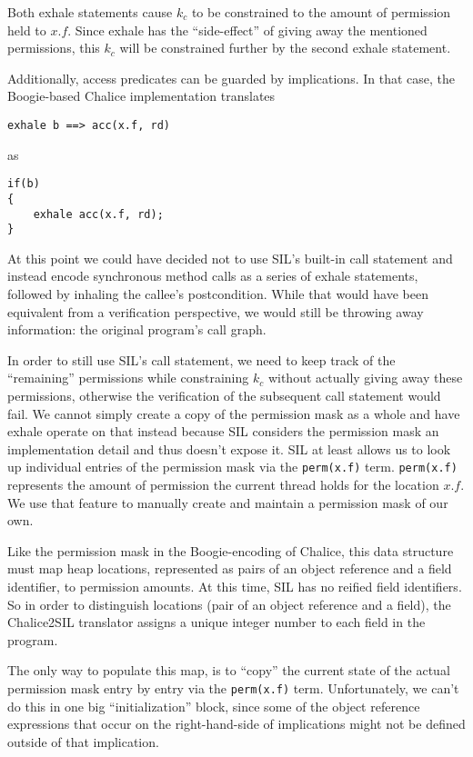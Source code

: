 Both exhale statements cause $k_c$ to be constrained to the amount of permission held to $x.f$. 
Since exhale has the “side-effect” of giving away the mentioned permissions, this $k_c$ will be constrained further by the second exhale statement.

Additionally, access predicates can be guarded by implications. 
In that case, the Boogie-based Chalice implementation translates 
\begin{lstlisting}[language=Chalice]
exhale b ==> acc(x.f, rd) 
\end{lstlisting}
as
\begin{lstlisting}[language=Chalice]
if(b) 
{ 
	exhale acc(x.f, rd);
}
\end{lstlisting}

At this point we could have decided not to use SIL's built-in call statement and instead encode synchronous method calls as a series of exhale statements, followed by inhaling the callee's postcondition. 
While that would have been equivalent from a verification perspective, we would still be throwing away information: the original program's call graph.

In order to still use SIL's call statement, we need to keep track of the “remaining” permissions while constraining $k_c$ without actually giving away these permissions, otherwise the verification of the subsequent call statement would fail. 
We cannot simply create a copy of the permission mask as a whole and have exhale operate on that instead because SIL considers the permission mask an implementation detail and thus doesn't expose it.
SIL at least allows us to look up individual entries of the permission mask via the \lstinline[language=SIL]!perm(x.f)! term. 
\hbox{\lstinline[language=SIL]!perm(x.f)!} represents the amount of permission the current thread holds for the location $x.f$.
We use that feature to manually create and maintain a permission mask of our own. 

Like the permission mask in the Boogie-encoding of Chalice, this data structure must map heap locations, represented as pairs of an object reference and a field identifier, to permission amounts. 
At this time, SIL has no reified field identifiers. 
So in order to distinguish locations (pair of an object reference and a field), the Chalice2SIL translator assigns a unique integer number to each field in the program. 

The only way to populate this map, is to ``copy'' the current state of the actual permission mask entry by entry via the \lstinline!perm(x.f)! term. 
Unfortunately, we can't do this in one big ``initialization'' block, since some of the object reference expressions that occur on the right-hand-side of implications might not be defined outside of that implication. 

